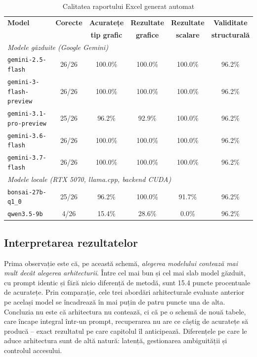 \documentclass[12pt, a4paper]{report}
\newcommand{\code}[1]{\texttt{#1}}
\begin{document}
\begin{table}[H]
\centering
\caption{Calitatea raportului Excel generat automat}
\label{tab:model_report}
\begin{tabular}{l c c c c c}
\toprule
\textbf{Model} & \textbf{Corecte} & \textbf{Acuratețe} & \textbf{Rezultate} & \textbf{Rezultate} & \textbf{Validitate} \\
 & & \textbf{tip grafic} & \textbf{grafice} & \textbf{scalare} & \textbf{structurală} \\
\midrule
\multicolumn{6}{l}{\emph{Modele găzduite (Google Gemini)}} \\
\code{gemini-2.5-flash} & 26/26 & 100.0\% & 100.0\% & 100.0\% & 96.2\% \\
\code{gemini-3-flash-preview} & 26/26 & 100.0\% & 100.0\% & 100.0\% & 96.2\% \\
\code{gemini-3.1-pro-preview} & 25/26 & 96.2\% & 92.9\% & 100.0\% & 96.2\% \\
\code{gemini-3.6-flash} & 26/26 & 100.0\% & 100.0\% & 100.0\% & 96.2\% \\
\code{gemini-3.7-flash} & 26/26 & 100.0\% & 100.0\% & 100.0\% & 96.2\% \\
\midrule
\multicolumn{6}{l}{\emph{Modele locale (RTX 5070, llama.cpp, backend CUDA)}} \\
\code{bonsai-27b-q1\_0} & 25/26 & 96.2\% & 100.0\% & 91.7\% & 96.2\% \\
\code{qwen3.5-9b} & 4/26 & 15.4\% & 28.6\% & 0.0\% & 96.2\% \\
\bottomrule
\end{tabular}
\end{table}

\subsection{Interpretarea rezultatelor}
\label{subsec:model_discussion}

Prima observație este că, pe această schemă, \emph{alegerea modelului contează
mai mult decât alegerea arhitecturii}. Între cel mai bun și cel mai slab model
găzduit, cu prompt identic și fără nicio diferență de metodă, sunt
15.4 puncte procentuale de acuratețe. Prin comparație, cele trei
abordări arhitecturale evaluate anterior pe același model se încadrează în mai
puțin de patru puncte una de alta. Concluzia nu este că arhitectura nu contează,
ci că pe o schemă de nouă tabele, care încape integral într-un prompt,
recuperarea nu are ce câștig de acuratețe să producă -- exact rezultatul pe care
capitolul îl anticipează. Diferențele pe care le aduce arhitectura sunt de altă
natură: latență, gestionarea ambiguității și controlul accesului.
\end{document}

